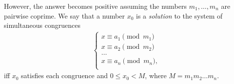 \documentclass[12pt,notitlepage]{article}
\theoremstyle{plain}
\theoremstyle{definition}
\theoremstyle{plain}
\newcommand{\1}{\mathbf{1}}
\newcommand{\0}{\mathbf{0}}
\begin{document}
However, the answer becomes positive assuming the numbers $m_1, \ldots, m_n$ are pairwise coprime.  We say that a number $x_0$ is a \emph{solution} to the system of simultaneous congruences
\begin{equation}\label{L6:eq5}
	\begin{array}{l}
		\begin{cases}
			x \equiv a_1 \pmod {m_1}\\
			x \equiv a_2 \pmod {m_2}\\
			\ldots\\
			x \equiv a_n \pmod {m_n},\\
		\end{cases}
	\end{array}
\end{equation}
iff $x_0$ satisfies each congruence and $0 \leq x_0 < M$, where $M = m_1 m_2 \ldots m_n$.
\end{document}
